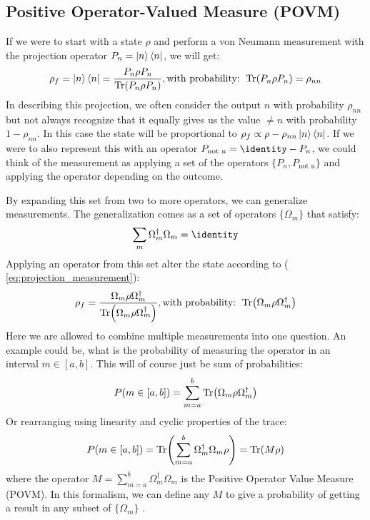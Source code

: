 \subsection{Positive Operator-Valued Measure (POVM)}
If we were to start with a state $\rho$ and perform a von Neumann measurement with the projection operator $P_n = \ket{n}\bra{n}$, we will get:
\begin{equation}\label{eq:projection_measurement}
    \rho_f = \ket{n}\bra{n}= \frac{P_n \rho P_n}{\Tr(P_n \rho P_n)}, \text{with probability: } \Tr(P_n \rho P_n) = \rho_{nn}
\end{equation}
In describing this projection, we often consider the output $n$ with probability $\rho_{nn}$ but not always recognize that it equally gives us the value $\neq n$ with probability $1 - \rho_{nn}$. In this case the state will be proportional to $\rho_f \propto \rho - \rho_{nn}\ket{n}\bra{n}$. If we were to also represent this with an operator $P_{\text{not n}} = \identity - P_n$, we could think of the measurement as applying  a set of the operators $\{P_n, P_{\text{not n}}\}$ and applying the operator depending on the outcome.

By expanding this set from two to more operators, we can generalize measurements. The generalization comes as a set of operators $\{\Omega_m\}$ that satisfy:
\begin{equation}\label{eq:sum_requirement_POVM}
    \sum_m \Omega_m^\dagger \Omega_m = \identity
\end{equation}
Applying an operator from this set alter the state according to ( \ref{eq:projection_measurement}):
\begin{equation}\label{eq:POVM_collapse}
        \rho_f = \frac{\Omega_m \rho  \Omega_m^\dagger}{\Tr(\Omega_m \rho \Omega_m^\dagger)}, \text{with probability: } \Tr(\Omega_m \rho \Omega_m^\dagger)
\end{equation}
Here we are allowed to combine multiple measurements into one question. An example could be, what is the probability of measuring the operator in an interval $m\in[a, b]$. This will of course just be sum of probabilities: 
\begin{equation}
    P(m \in [a, b]) = \sum_{m = a}^b \Tr(\Omega_m\rho\Omega_m^\dagger)
\end{equation}
Or rearranging using linearity and cyclic properties of the trace:
\begin{equation}
    P(m \in [a, b]) = \Tr( \sum_{m = a}^b \Omega_m^\dagger \Omega_m\rho) = \Tr(M \rho)
\end{equation}
where the operator $M = \sum_{m = a}^b \Omega_m^\dagger \Omega_m$ is the Positive Operator Value Measure (POVM). In this formalism, we can define any $M$ to give a probability of getting a result in any subset of $\{\Omega_m\}$ \cite{jacobs_straightforward_2006}. 

